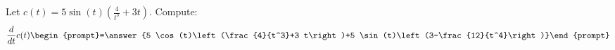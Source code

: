 \documentclass{ximera}
\author{Bart Snapp\and Nela Lakos}
\begin{document}
\begin{exercise}
Let $c(t) = 5 \sin (t)\left(\frac{4}{t^3}+3 t\right) $. Compute:
\[
\frac{d}{dt}c(t)
\begin{prompt}=\answer{5 \cos (t)\left(\frac{4}{t^3}+3 t\right)+5 \sin (t)\left(3-\frac{12}{t^4}\right)}\end{prompt}
\]
\end{exercise}
\end{document}
